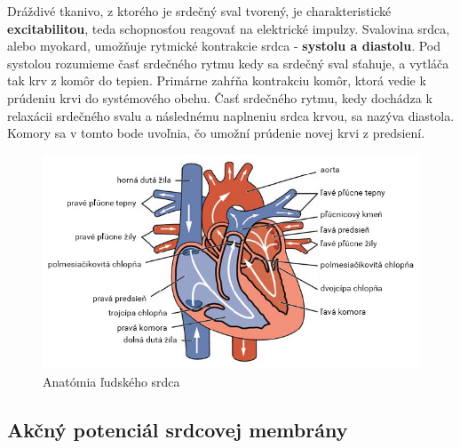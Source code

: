 Dráždivé tkanivo, z ktorého je srdečný sval tvorený, je charakteristické \textbf{excitabilitou}, teda schopnosťou reagovať na elektrické impulzy. Svalovina srdca, alebo myokard, umožňuje rytmické kontrakcie srdca - \textbf{systolu a diastolu}. Pod systolou rozumieme časť srdečného rytmu kedy sa srdečný sval sťahuje, a vytláča tak krv z komôr do tepien. Primárne zahŕňa kontrakciu komôr, ktorá vedie k prúdeniu krvi do systémového obehu. Časť srdečného rytmu, kedy dochádza k relaxácii srdečného svalu a následnému naplneniu srdca krvou, sa nazýva diastola. Komory sa v tomto bode uvoľnia, čo umožní prúdenie novej krvi z predsiení.\cite{Weinhaus}

\begin{figure}[t]
    \centering
    \includegraphics[scale=0.6]{img/srdce.jpg}
    \caption{Anatómia ľudského srdca\cite{Pančík_2016}}
\end{figure}

\subsection{Akčný potenciál srdcovej membrány}

